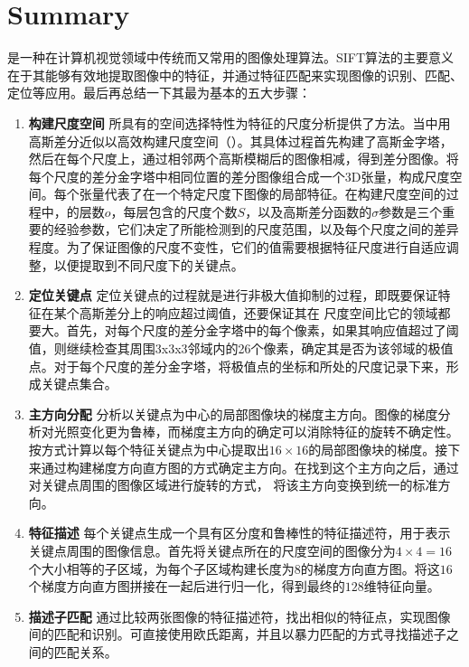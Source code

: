 \part{Summary}\label{part:Summary}

\sift 是一种在计算机视觉领域中传统而又常用的图像处理算法。SIFT算法的主要意义在于其能够有效地提取图像中的特征，并通过特征匹配来实现图像的识别、匹配、定位等应用。最后再总结一下其最为基本的五大步骤：
\begin{enumerate}
    \item \textbf{构建尺度空间} \quad \lpl 所具有的空间选择特性为特征的尺度分析提供了方法。\sift 当中用高斯差分近似\lpl 以高效构建尺度空间（）。其具体过程首先构建了高斯金字塔，然后在每个尺度上，通过相邻两个高斯模糊后的图像相减，得到差分图像。将每个尺度的差分金字塔中相同位置的差分图像组合成一个3D张量，构成尺度空间。每个张量代表了在一个特定尺度下图像的局部特征。在构建尺度空间的过程中，\octave 的层数$o$，每层\octave 包含的尺度个数$S$，以及高斯差分函数的$\sigma$参数是三个重要的经验参数，它们决定了所能检测到的尺度范围，以及每个尺度之间的差异程度。为了保证图像的尺度不变性，它们的值需要根据特征尺度进行自适应调整，以便提取到不同尺度下的关键点。
    \item \textbf{定位关键点} \quad 定位关键点的过程就是进行非极大值抑制的过程，即既要保证特征在某个高斯差分上的响应超过阈值，还要保证其在 \DoG 尺度空间比它的领域都要大。首先，对每个尺度的差分金字塔中的每个像素，如果其响应值超过了阈值，则继续检查其周围3x3x3邻域内的26个像素，确定其是否为该邻域的极值点。对于每个尺度的差分金字塔，将极值点的坐标和所处的尺度记录下来，形成关键点集合。
    \item \textbf{主方向分配} \quad 分析以关键点为中心的局部图像块的梯度主方向。图像的梯度分析对光照变化更为鲁棒，而梯度主方向的确定可以消除特征的旋转不确定性。按方式计算以每个\sift 特征关键点为中心提取出$16\times 16$的局部图像块的梯度。接下来通过构建梯度方向直方图的方式确定主方向。在找到这个主方向之后，通过对关键点周围的图像区域进行旋转的方式， 将该主方向变换到统一的标准方向。
    \item \textbf{特征描述} \quad 每个关键点生成一个具有区分度和鲁棒性的特征描述符，用于表示关键点周围的图像信息。首先将关键点所在的尺度空间的图像分为$4\times 4 =16$个大小相等的子区域，为每个子区域构建长度为$8$的梯度方向直方图。将这$16$个梯度方向直方图拼接在一起后进行归一化，得到最终的$128$维特征向量。
    \item \textbf{描述子匹配} \quad 通过比较两张图像的特征描述符，找出相似的特征点，实现图像间的匹配和识别。可直接使用欧氏距离，并且以暴力匹配的方式寻找描述子之间的匹配关系。
\end{enumerate}

